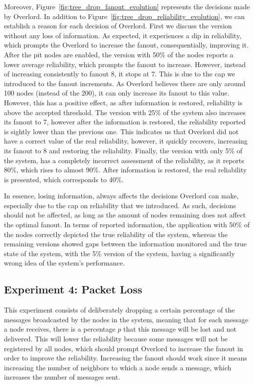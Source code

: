 Moreover, Figure~\ref{fig:tree_drop_fanout_evolution} represents the decisions made by Overlord. In addition to Figure~\ref{fig:tree_drop_reliability_evolution}, we can establish a reason for each decision of Overlord. First we discuss the version without any loss of information. As expected, it experiences a dip in reliability, which prompts the Overlord to increase the fanout, consequentially, improving it. After the pit nodes are enabled, the version with 50\% of the nodes reports a lower average reliability, which prompts the fanout to increase. However, instead of increasing consistently to fanout 8, it stops at 7. This is due to the cap we introduced to the fanout increments. As Overlord believes there are only around 100 nodes (instead of the 200), it can only increase its fanout to this value. However, this has a positive effect, as after information is restored, reliability is above the accepted threshold. The version with 25\% of the system also increases its fanout to 7, however after the information is restored, the reliability reported is sightly lower than the previous one. This indicates us that Overlord did not have a correct value of the real reliability, however, it quickly recovers, increasing its fanout to 8 and restoring the reliability. Finally, the version with only 5\% of the system, has a completely incorrect assessment of the reliability, as it reports 80\%, which rises to almost 90\%. After information is restored, the real reliability is presented, which corresponds to 40\%.

In essence, losing information, always affects the decisions Overlord can make, especially due to the cap on reliability that we introduced. As such, decisions should not be affected, as long as the amount of nodes remaining does not affect the optimal fanout. In terms of reported information, the application with 50\% of the nodes correctly depicted the true reliability of the system, whereas the remaining versions showed gaps between the information monitored and the true state of the system, with the 5\% version of the system, having a significantly wrong idea of the system's performance. 

\subsection{Experiment 4: Packet Loss}
\label{ssec:packet_loss}

This experiment consists of deliberately dropping a certain percentage of the messages broadcasted by the nodes in the system, meaning that for each message a node receives, there is a percentage $p$ that this message will be lost and not delivered. This will lower the reliability because some messages will not be registered by all nodes, which should prompt Overlord to increase the fanout in order to improve the reliability. Increasing the fanout should work since it means increasing the number of neighbors to which a node sends a message, which increases the number of messages sent.

